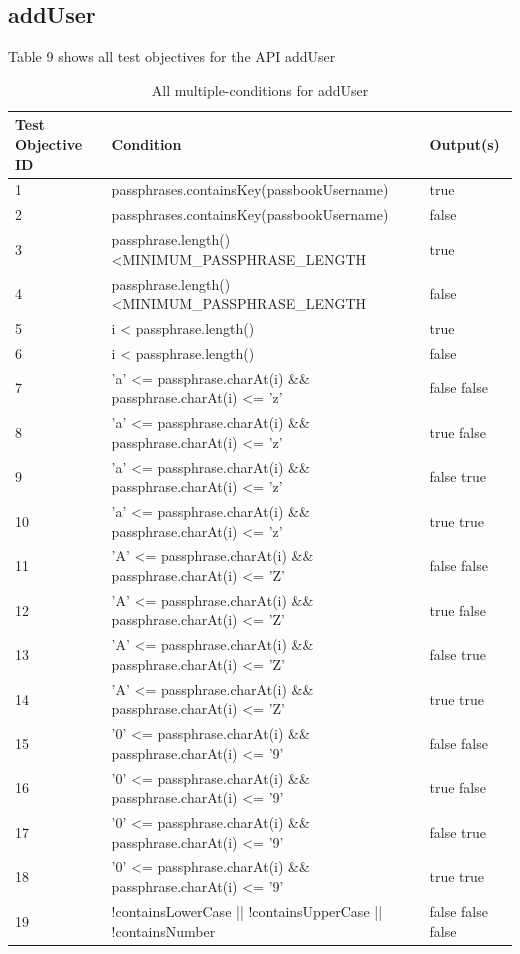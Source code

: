 \documentclass{article}
\begin{document}
\subsection{addUser}
Table 9 shows all test objectives for the API addUser
\begin{longtable}{|p{2cm}|p{10cm}|p{3cm}|}
\caption{All multiple-conditions for addUser}\\
\hline 
Test Objective ID&Condition&Output(s)\\
\hline  
1&passphrases.containsKey(passbookUsername)&true\\
\hline
2&passphrases.containsKey(passbookUsername)&false\\
\hline
3&passphrase.length() \textless MINIMUM\_PASSPHRASE\_LENGTH&true\\
\hline
4&passphrase.length() \textless MINIMUM\_PASSPHRASE\_LENGTH&false\\
\hline
5&i < passphrase.length()&true\\
\hline
6&i < passphrase.length()&false\\
\hline
7&'a' <= passphrase.charAt(i) \&\& passphrase.charAt(i) <= 'z'&false false\\
\hline
8&'a' <= passphrase.charAt(i) \&\& passphrase.charAt(i) <= 'z'&true false\\
\hline
9&'a' <= passphrase.charAt(i) \&\& passphrase.charAt(i) <= 'z'&false true\\
\hline
10&'a' <= passphrase.charAt(i) \&\& passphrase.charAt(i) <= 'z'&true true\\
\hline
11&'A' <= passphrase.charAt(i) \&\& passphrase.charAt(i) <= 'Z'&false false\\
\hline
12&'A' <= passphrase.charAt(i) \&\& passphrase.charAt(i) <= 'Z'&true false\\
\hline
13&'A' <= passphrase.charAt(i) \&\& passphrase.charAt(i) <= 'Z'&false true\\
\hline
14&'A' <= passphrase.charAt(i) \&\& passphrase.charAt(i) <= 'Z'&true true\\
\hline
15&'0' <= passphrase.charAt(i) \&\& passphrase.charAt(i) <= '9'&false false\\
\hline
16&'0' <= passphrase.charAt(i) \&\& passphrase.charAt(i) <= '9'&true false\\
\hline
17&'0' <= passphrase.charAt(i) \&\& passphrase.charAt(i) <= '9'&false true\\
\hline
18&'0' <= passphrase.charAt(i) \&\& passphrase.charAt(i) <= '9'&true true\\
\hline
19&!containsLowerCase || !containsUpperCase || !containsNumber&false false false\\

\end{longtable}
\end{document}
